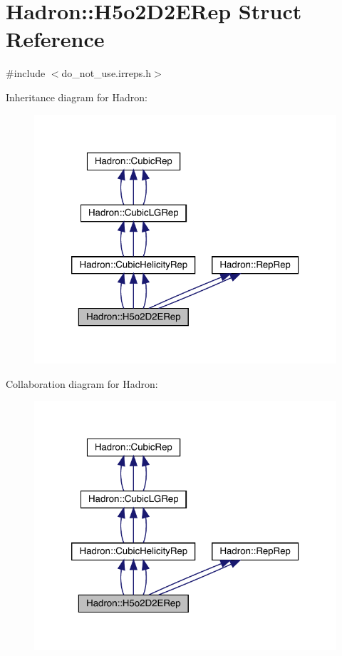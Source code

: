 \hypertarget{structHadron_1_1H5o2D2ERep}{}\section{Hadron\+:\+:H5o2\+D2\+E\+Rep Struct Reference}
\label{structHadron_1_1H5o2D2ERep}


{\ttfamily \#include $<$do\+\_\+not\+\_\+use.\+irreps.\+h$>$}



Inheritance diagram for Hadron\+:
\nopagebreak
\begin{figure}[H]
\begin{center}
\leavevmode
\includegraphics[width=320pt]{d7/d6e/structHadron_1_1H5o2D2ERep__inherit__graph}
\end{center}
\end{figure}


Collaboration diagram for Hadron\+:
\nopagebreak
\begin{figure}[H]
\begin{center}
\leavevmode
\includegraphics[width=320pt]{d7/d73/structHadron_1_1H5o2D2ERep__coll__graph}
\end{center}
\end{figure}
